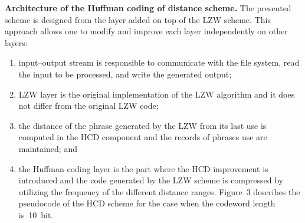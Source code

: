 \begin{multicols}{2}
\noindent
\textbf{Architecture of the Huffman coding of distance scheme.}
The presented scheme is designed from the layer added on top of the {LZW} 
scheme. This approach allows one to modify and improve each layer independently 
on  other layers:
\begin{enumerate}[(1)]
\item    input--output stream is responsible to communicate with the file system, 
read the input to be processed, and write the generated output;
\item    {LZW} layer is the original implementation of the {LZW} 
algorithm and it does not differ from the original {LZW} code; 
\item the distance of the phrase generated by the {LZW} from its last use 
is computed in the HCD component and the records of phrases use are maintained; and
\item  the Huffman coding layer is the part where the HCD improvement is introduced 
and the code
 generated by the {LZW} scheme is compressed by utilizing 
the frequency of the different distance ranges.
Figure~3 describes the pseudocode of the HCD scheme for the case when 
the codeword length is~10~bit.
\end{enumerate}

{%
\small
\vspace{1mm}
\begin{footnotesize}
\begin{center}


\end{center}
\end{footnotesize}}
\end{multicols}
